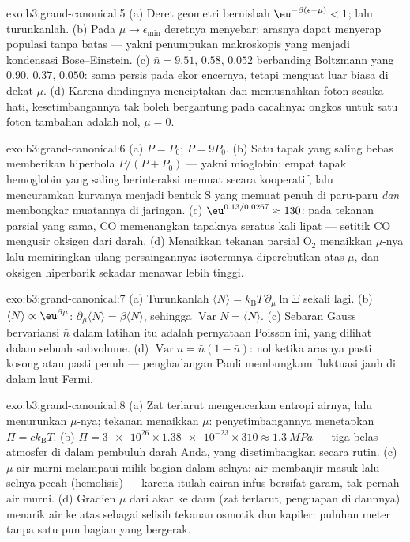 \begin{solution}{exo:b3:grand-canonical:5}
(a) Deret geometri bernisbah $\eu^{-\beta(\epsilon-\mu)} < 1$;
lalu turunkanlah. (b) Pada $\mu \to \epsilon_{\min}$ deretnya
menyebar: arasnya dapat menyerap populasi tanpa batas --- yakni
penumpukan makroskopis yang menjadi kondensasi Bose--Einstein. (c)
$\bar n = 9.51$, $0.58$, $0.052$ berbanding Boltzmann yang $0.90$,
$0.37$, $0.050$: sama persis pada ekor encernya, tetapi menguat luar
biasa di dekat $\mu$. (d) Karena dindingnya menciptakan dan memusnahkan
foton sesuka hati, kesetimbangannya tak boleh bergantung pada cacahnya:
ongkos  untuk satu foton tambahan adalah nol, $\mu = 0$.
\end{solution}

\begin{solution}{exo:b3:grand-canonical:6}
(a) $P = P_0$; $P = 9P_0$. (b) Satu tapak yang saling bebas memberikan
hiperbola $P/(P + P_0)$ --- yakni mioglobin; empat tapak hemoglobin yang
saling berinteraksi memuat secara kooperatif, lalu mencuramkan kurvanya
menjadi bentuk S yang memuat penuh di paru-paru \emph{dan} membongkar
muatannya di jaringan. (c) $\eu^{0.13/0.0267} \approx 130$: pada tekanan
parsial yang sama, CO memenangkan tapaknya seratus kali lipat --- setitik
CO mengusir oksigen dari darah. (d) Menaikkan tekanan parsial O$_2$
menaikkan $\mu$-nya lalu memiringkan ulang persaingannya:
isotermnya diperebutkan atas $\mu$, dan oksigen hiperbarik sekadar
menawar lebih tinggi.
\end{solution}

\begin{solution}{exo:b3:grand-canonical:7}
(a) Turunkanlah $\langle N\rangle = k_{\text{B}}T\,\partial_\mu
\ln\Xi$ sekali lagi. (b) $\langle N\rangle \propto
\eu^{\beta\mu}$: $\partial_\mu\langle N\rangle = \beta\langle
N\rangle$, sehingga $\operatorname{Var}N = \langle N\rangle$. (c) Sebaran
Gauss bervariansi $\bar n$ dalam latihan itu adalah pernyataan Poisson
ini, yang dilihat dalam sebuah subvolume. (d) $\operatorname{Var}n =
\bar n(1 - \bar n)$: nol ketika arasnya pasti kosong atau pasti
penuh --- penghadangan Pauli membungkam fluktuasi jauh di dalam laut Fermi.
\end{solution}

\begin{solution}{exo:b3:grand-canonical:8}
(a) Zat terlarut mengencerkan entropi airnya, lalu menurunkan $\mu$-nya;
tekanan menaikkan $\mu$: penyetimbangannya menetapkan $\Pi = ck_{\text{B}}T$. (b) $\Pi =
\num{3e26} \times \num{1.38e-23} \times 310 \approx
\qty{1.3}{MPa}$ --- tiga belas atmosfer di dalam pembuluh darah Anda,
yang disetimbangkan secara rutin. (c) $\mu$ air murni melampaui milik
bagian dalam selnya: air membanjir masuk lalu selnya pecah (hemolisis)
--- karena itulah cairan infus bersifat garam, tak pernah air murni. (d)
Gradien $\mu$ dari akar ke daun (zat terlarut, penguapan di daunnya)
menarik air ke atas sebagai selisih tekanan osmotik dan kapiler: puluhan
meter tanpa satu pun bagian yang bergerak.
\end{solution}

